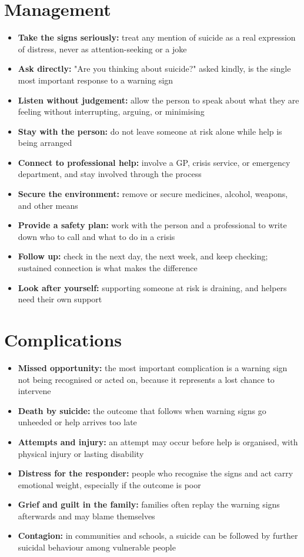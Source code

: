 \section*{Management}
\begin{itemize}
    \item \textbf{Take the signs seriously:} treat any mention of suicide as a real expression of distress, never as attention-seeking or a joke
    \item \textbf{Ask directly:} "Are you thinking about suicide?" asked kindly, is the single most important response to a warning sign
    \item \textbf{Listen without judgement:} allow the person to speak about what they are feeling without interrupting, arguing, or minimising
    \item \textbf{Stay with the person:} do not leave someone at risk alone while help is being arranged
    \item \textbf{Connect to professional help:} involve a GP, crisis service, or emergency department, and stay involved through the process
    \item \textbf{Secure the environment:} remove or secure medicines, alcohol, weapons, and other means
    \item \textbf{Provide a safety plan:} work with the person and a professional to write down who to call and what to do in a crisis
    \item \textbf{Follow up:} check in the next day, the next week, and keep checking; sustained connection is what makes the difference
    \item \textbf{Look after yourself:} supporting someone at risk is draining, and helpers need their own support
\end{itemize}

\section*{Complications}
\begin{itemize}
    \item \textbf{Missed opportunity:} the most important complication is a warning sign not being recognised or acted on, because it represents a lost chance to intervene
    \item \textbf{Death by suicide:} the outcome that follows when warning signs go unheeded or help arrives too late
    \item \textbf{Attempts and injury:} an attempt may occur before help is organised, with physical injury or lasting disability
    \item \textbf{Distress for the responder:} people who recognise the signs and act carry emotional weight, especially if the outcome is poor
    \item \textbf{Grief and guilt in the family:} families often replay the warning signs afterwards and may blame themselves
    \item \textbf{Contagion:} in communities and schools, a suicide can be followed by further suicidal behaviour among vulnerable people
\end{itemize}


